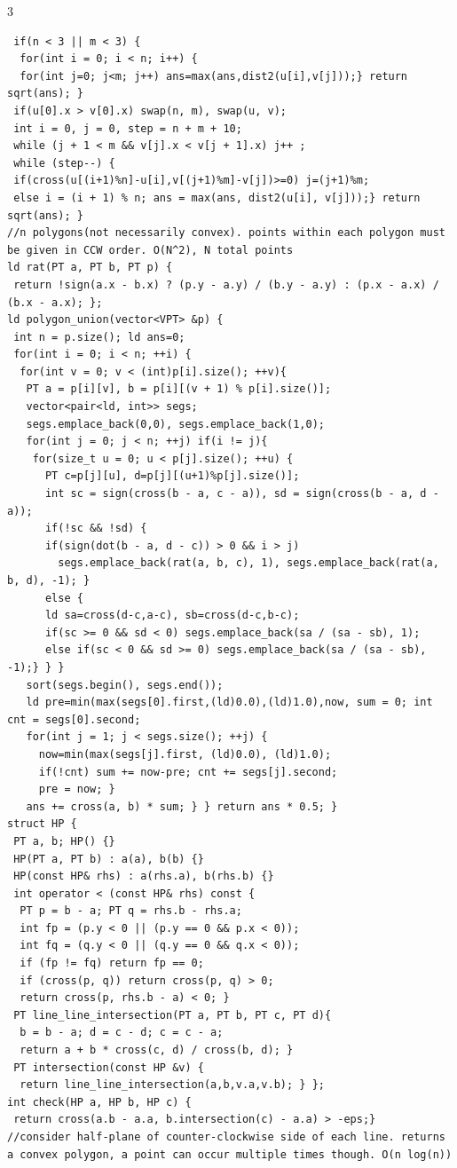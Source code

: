 \documentclass[8pt,a4paper,onesided]{article}
\begin{document}
\begin{multicols}{3}
\begin{verbatim}
 if(n < 3 || m < 3) {
  for(int i = 0; i < n; i++) {
  for(int j=0; j<m; j++) ans=max(ans,dist2(u[i],v[j]));} return sqrt(ans); }
 if(u[0].x > v[0].x) swap(n, m), swap(u, v);
 int i = 0, j = 0, step = n + m + 10;
 while (j + 1 < m && v[j].x < v[j + 1].x) j++ ;
 while (step--) {
 if(cross(u[(i+1)%n]-u[i],v[(j+1)%m]-v[j])>=0) j=(j+1)%m;
 else i = (i + 1) % n; ans = max(ans, dist2(u[i], v[j]));} return sqrt(ans); }
//n polygons(not necessarily convex). points within each polygon must be given in CCW order. O(N^2), N total points
ld rat(PT a, PT b, PT p) {
 return !sign(a.x - b.x) ? (p.y - a.y) / (b.y - a.y) : (p.x - a.x) / (b.x - a.x); };
ld polygon_union(vector<VPT> &p) {
 int n = p.size(); ld ans=0;
 for(int i = 0; i < n; ++i) {
  for(int v = 0; v < (int)p[i].size(); ++v){
   PT a = p[i][v], b = p[i][(v + 1) % p[i].size()];
   vector<pair<ld, int>> segs;
   segs.emplace_back(0,0), segs.emplace_back(1,0);
   for(int j = 0; j < n; ++j) if(i != j){
    for(size_t u = 0; u < p[j].size(); ++u) {
      PT c=p[j][u], d=p[j][(u+1)%p[j].size()];
      int sc = sign(cross(b - a, c - a)), sd = sign(cross(b - a, d - a));
      if(!sc && !sd) {
      if(sign(dot(b - a, d - c)) > 0 && i > j)
        segs.emplace_back(rat(a, b, c), 1), segs.emplace_back(rat(a, b, d), -1); }
      else {
      ld sa=cross(d-c,a-c), sb=cross(d-c,b-c);
      if(sc >= 0 && sd < 0) segs.emplace_back(sa / (sa - sb), 1);
      else if(sc < 0 && sd >= 0) segs.emplace_back(sa / (sa - sb), -1);} } }
   sort(segs.begin(), segs.end());
   ld pre=min(max(segs[0].first,(ld)0.0),(ld)1.0),now, sum = 0; int cnt = segs[0].second;
   for(int j = 1; j < segs.size(); ++j) {
     now=min(max(segs[j].first, (ld)0.0), (ld)1.0);
     if(!cnt) sum += now-pre; cnt += segs[j].second;
     pre = now; }
   ans += cross(a, b) * sum; } } return ans * 0.5; }
struct HP {
 PT a, b; HP() {}
 HP(PT a, PT b) : a(a), b(b) {}
 HP(const HP& rhs) : a(rhs.a), b(rhs.b) {}
 int operator < (const HP& rhs) const {
  PT p = b - a; PT q = rhs.b - rhs.a;
  int fp = (p.y < 0 || (p.y == 0 && p.x < 0));
  int fq = (q.y < 0 || (q.y == 0 && q.x < 0));
  if (fp != fq) return fp == 0;
  if (cross(p, q)) return cross(p, q) > 0;
  return cross(p, rhs.b - a) < 0; }
 PT line_line_intersection(PT a, PT b, PT c, PT d){
  b = b - a; d = c - d; c = c - a;
  return a + b * cross(c, d) / cross(b, d); }
 PT intersection(const HP &v) {
  return line_line_intersection(a,b,v.a,v.b); } };
int check(HP a, HP b, HP c) {
 return cross(a.b - a.a, b.intersection(c) - a.a) > -eps;}
//consider half-plane of counter-clockwise side of each line. returns a convex polygon, a point can occur multiple times though. O(n log(n))

\end{verbatim}
\end{multicols}
\end{document}
